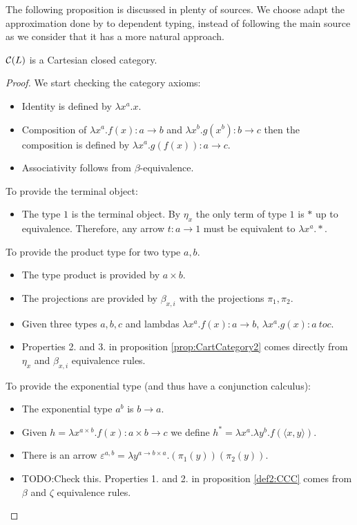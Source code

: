 \begin{definition}
 The following proposition is discussed in plenty of sources. We choose adapt the approximation done by \cite{seely1984locally} to dependent typing, instead of following the main source \cite{lambek1985cartesian} as we consider that it has a more natural approach.
 \begin{proposition}
   $\mathcal{C} (L)$ is a Cartesian closed category. 
 \end{proposition}
 \begin{proof}
   We start checking the category axioms:
   \begin{itemize}
   \item Identity is defined by $\lambda x^a.x$.
   \item Composition of $\lambda x^a. f(x):  a\to b$ and $\lambda x^b. g(x^b): b \to c$ then the composition is defined by $\lambda x^a. g(f(x)): a \to c$.
   \item Associativity follows from $\beta$-equivalence.\\
   \end{itemize}
   To provide the terminal object:
   \begin{itemize}
   \item The type $1$ is the terminal object. By $\eta_x$ the only term of type $1$ is $*$ up to equivalence. Therefore, any arrow $t:a \to 1$ must be equivalent to $\lambda x^a. *$.\\
   \end{itemize}
   To provide the product type for two type $a,b$.
   \begin{itemize}
   \item The type product is provided by $a \times b$.
   \item The projections are provided by $\beta_{x,i}$ with the projections $\pi_1,\pi_2$.
   \item Given three types $a,b,c$ and lambdas $\lambda x^a. f(x) : a\to b$, $\lambda x^a. g(x) : a\ to c$.
   \item Properties 2. and 3. in proposition \ref{prop:CartCategory2} comes directly from $\eta_x$ and $\beta_{x,i}$ equivalence rules.\\
   \end{itemize}
   To provide the exponential type (and thus have a conjunction calculus):
   \begin{itemize}
   \item The exponential type $a^b$ is $b\to a$.
   \item Given $h = \lambda x^{a\times b}. f(x): a\times b \to c$  we define $h^* = \lambda x^a. \lambda y^b. f(\langle x,y\rangle)$.
   \item There is an arrow $\varepsilon^{a,b} = \lambda y^{a\to b \times a}. (\pi_1(y))(\pi_2(y))$.
   \item TODO:Check this. Properties 1. and 2. in proposition \ref{def2:CCC} comes from $\beta$ and $\zeta$ equivalence rules.
   \end{itemize}
 \end{proof}


\end{definition}
